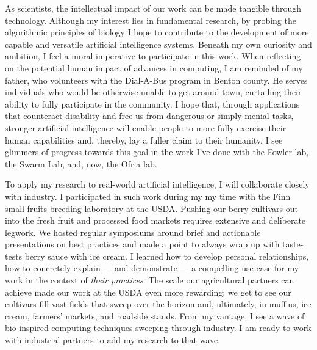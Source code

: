 As scientists, the intellectual impact of our work can be made tangible through technology.
Although my interest lies in fundamental research, by probing the algorithmic principles of biology I hope to contribute to the development of more capable and versatile artificial intelligence systems.
Beneath my own curiosity and ambition, I feel a moral imperative to participate in this work.
When reflecting on the potential human impact of advances in computing, I am reminded of my father, who volunteers with the Dial-A-Bus program in Benton county.
He serves individuals who would be otherwise unable to get around town, curtailing their ability to fully participate in the community.
I hope that, through applications that counteract disability and free us from dangerous or simply menial tasks, stronger artificial intelligence will enable people to more fully exercise their human capabilities and, thereby, lay a fuller claim to their humanity.
I see glimmers of progress towards this goal in the work I've done with the Fowler lab, the Swarm Lab, and, now, the Ofria lab.

To apply my research to real-world artificial intelligence, I will collaborate closely with industry.
I participated in such work during my my time with the Finn small fruits breeding laboratory at the USDA.
Pushing our berry cultivars out into the fresh fruit and processed food markets requires extensive and deliberate legwork.
We hosted regular symposiums around brief and actionable presentations on best practices and made a point to always wrap up with taste-tests berry sauce with ice cream.
I learned how to develop personal relationships, how to concretely explain --- and demonstrate --- a compelling use case for my work in the context of \textit{their practices}.
The scale our agricultural partners can achieve made our work at the USDA even more rewarding;
we get to see our cultivars fill vast fields that sweep over the horizon and, ultimately, in muffins, ice cream, farmers' markets, and roadside stands.
From my vantage, I see a wave of bio-inspired computing techniques sweeping through industry.
I am ready to work with industrial partners to add my research to that wave.
